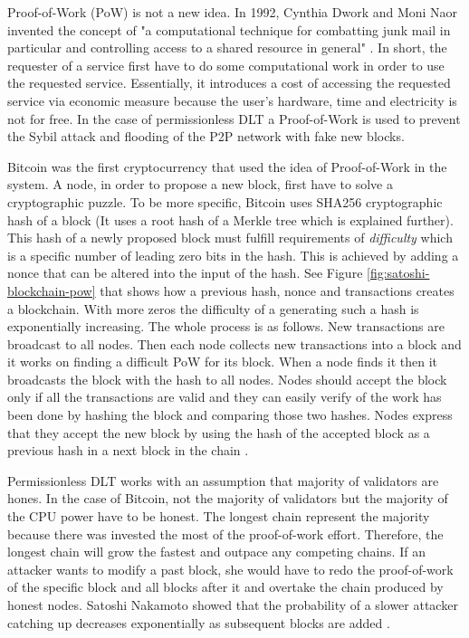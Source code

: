 Proof-of-Work (PoW) is not a new idea. In 1992, Cynthia Dwork and Moni Naor invented the concept of "a computational technique for combatting junk mail in particular and controlling access to a shared resource in general" \cite{dwork_pricing_1992}.
In short, the requester of a service first have to do some computational work in order to use the requested service. Essentially, it introduces a cost of accessing the requested service via economic measure because the user's hardware, time and electricity is not for free. In the case of permissionless DLT a Proof-of-Work is used to prevent the Sybil attack and flooding of the P2P network with fake new blocks. 

Bitcoin was the first cryptocurrency that used the idea of Proof-of-Work in the system. A node, in order to propose a new block, first have to solve a cryptographic puzzle. To be more specific, Bitcoin uses SHA256 cryptographic hash of a block (It uses a root hash of a Merkle tree which is explained further). This hash of a newly proposed block must fulfill requirements of \textit{difficulty} which is a specific number of leading zero bits in the hash. This is achieved by adding a nonce that can be altered into the input of the hash. See Figure \ref{fig:satoshi-blockchain-pow} that shows how a previous hash, nonce and transactions creates a blockchain. With more zeros the difficulty of a generating such a hash is exponentially increasing. The whole process is as follows. New transactions are broadcast to all nodes. Then each node collects new transactions into a block and it works on finding a difficult PoW for its block. When a node finds it then it broadcasts the block with the hash to all nodes. Nodes should accept the block only if all the transactions are valid and they can easily verify of the work has been done by hashing the block and comparing those two hashes. Nodes express that they accept the new block by using the hash of the accepted block as a previous hash in a next block in the chain \cite{nakamoto_bitcoin:_2008}. 

Permissionless DLT works with an assumption that majority of validators are hones. In the case of Bitcoin, not the majority of validators but the majority of the CPU power have to be honest. The longest chain represent the majority because there was invested the most of the proof-of-work effort. Therefore, the longest chain will grow the fastest and outpace any competing chains. If an attacker wants to modify a past block, she would have to redo the proof-of-work of the specific block and all blocks after it and overtake the chain produced by honest nodes. Satoshi Nakamoto showed that the probability of a slower attacker catching up decreases exponentially as subsequent blocks are added \cite{nakamoto_bitcoin:_2008}.

